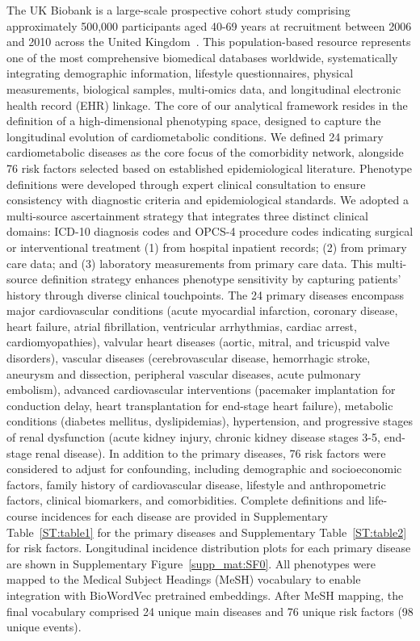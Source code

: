 The UK Biobank is a large-scale prospective cohort study comprising approximately 500,000 participants aged 40-69 years at recruitment between 2006 and 2010 across the United Kingdom~\citet{Sudlow2015UKBiobank}. This population-based resource represents one of the most comprehensive biomedical databases worldwide, systematically integrating demographic information, lifestyle questionnaires, physical measurements, biological samples, multi-omics data, and longitudinal electronic health record (EHR) linkage. The core of our analytical framework resides in the definition of a high-dimensional phenotyping space, designed to capture the longitudinal evolution of cardiometabolic conditions. We defined 24 primary cardiometabolic diseases as the core focus of the comorbidity network, alongside 76 risk factors selected based on established epidemiological literature. Phenotype definitions were developed through expert clinical consultation to ensure consistency with diagnostic criteria and epidemiological standards. We adopted a multi-source ascertainment strategy that integrates three distinct clinical domains: ICD-10 diagnosis codes and OPCS-4 procedure codes indicating surgical or interventional treatment (1) from hospital inpatient records; (2) from primary care data; and (3) laboratory measurements from primary care data. This multi-source definition strategy enhances phenotype sensitivity by capturing patients' history through diverse clinical touchpoints. The 24 primary diseases encompass major cardiovascular conditions (acute myocardial infarction, coronary disease, heart failure, atrial fibrillation, ventricular arrhythmias, cardiac arrest, cardiomyopathies), valvular heart diseases (aortic, mitral, and tricuspid valve disorders), vascular diseases (cerebrovascular disease, hemorrhagic stroke, aneurysm and dissection, peripheral vascular diseases, acute pulmonary embolism), advanced cardiovascular interventions (pacemaker implantation for conduction delay, heart transplantation for end-stage heart failure), metabolic conditions (diabetes mellitus, dyslipidemias), hypertension, and progressive stages of renal dysfunction (acute kidney injury, chronic kidney disease stages 3-5, end-stage renal disease). In addition to the primary diseases, 76 risk factors were considered to adjust for confounding, including demographic and socioeconomic factors, family history of cardiovascular disease, lifestyle and anthropometric factors, clinical biomarkers, and comorbidities. Complete definitions and life-course incidences for each disease are provided in Supplementary Table~\ref{ST:table1} for the primary diseases and Supplementary Table~\ref{ST:table2} for risk factors. Longitudinal incidence distribution plots for each primary disease are shown in Supplementary Figure~\ref{supp_mat:SF0}. All phenotypes were mapped to the Medical Subject Headings (MeSH) vocabulary to enable integration with BioWordVec pretrained embeddings. After MeSH mapping, the final vocabulary comprised 24 unique main diseases and 76 unique risk factors (98 unique events). 